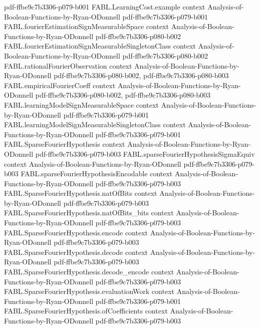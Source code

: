 \begin{theorem}
  {pdf-ffbe9c7b3306-p079-b001}
\proofstep
  {FABL.LearningCost.example}
  {context}
  {Analysis-of-Boolean-Functions-by-Ryan-ODonnell}
  {pdf-ffbe9c7b3306-p079-b001}
\proofstep
  {FABL.fourierEstimationSignMeasurableSpace}
  {context}
  {Analysis-of-Boolean-Functions-by-Ryan-ODonnell}
  {pdf-ffbe9c7b3306-p080-b002}
\proofstep
  {FABL.fourierEstimationSignMeasurableSingletonClass}
  {context}
  {Analysis-of-Boolean-Functions-by-Ryan-ODonnell}
  {pdf-ffbe9c7b3306-p080-b002}
\proofstep
  {FABL.rationalFourierObservation}
  {context}
  {Analysis-of-Boolean-Functions-by-Ryan-ODonnell}
  {pdf-ffbe9c7b3306-p080-b002,
    pdf-ffbe9c7b3306-p080-b003}
\proofstep
  {FABL.empiricalFourierCoeff}
  {context}
  {Analysis-of-Boolean-Functions-by-Ryan-ODonnell}
  {pdf-ffbe9c7b3306-p080-b002,
    pdf-ffbe9c7b3306-p080-b003}
\proofstep
  {FABL.learningModelSignMeasurableSpace}
  {context}
  {Analysis-of-Boolean-Functions-by-Ryan-ODonnell}
  {pdf-ffbe9c7b3306-p079-b001}
\proofstep
  {FABL.learningModelSignMeasurableSingletonClass}
  {context}
  {Analysis-of-Boolean-Functions-by-Ryan-ODonnell}
  {pdf-ffbe9c7b3306-p079-b001}
\proofstep
  {FABL.SparseFourierHypothesis}
  {context}
  {Analysis-of-Boolean-Functions-by-Ryan-ODonnell}
  {pdf-ffbe9c7b3306-p079-b003}
\proofstep
  {FABL.sparseFourierHypothesisSigmaEquiv}
  {context}
  {Analysis-of-Boolean-Functions-by-Ryan-ODonnell}
  {pdf-ffbe9c7b3306-p079-b003}
\proofstep
  {FABL.sparseFourierHypothesisEncodable}
  {context}
  {Analysis-of-Boolean-Functions-by-Ryan-ODonnell}
  {pdf-ffbe9c7b3306-p079-b003}
\proofstep
  {FABL.SparseFourierHypothesis.natOfBits}
  {context}
  {Analysis-of-Boolean-Functions-by-Ryan-ODonnell}
  {pdf-ffbe9c7b3306-p079-b003}
\proofstep
  {FABL.SparseFourierHypothesis.natOfBits_bits}
  {context}
  {Analysis-of-Boolean-Functions-by-Ryan-ODonnell}
  {pdf-ffbe9c7b3306-p079-b003}
\proofstep
  {FABL.SparseFourierHypothesis.encode}
  {context}
  {Analysis-of-Boolean-Functions-by-Ryan-ODonnell}
  {pdf-ffbe9c7b3306-p079-b003}
\proofstep
  {FABL.SparseFourierHypothesis.decode}
  {context}
  {Analysis-of-Boolean-Functions-by-Ryan-ODonnell}
  {pdf-ffbe9c7b3306-p079-b003}
\proofstep
  {FABL.SparseFourierHypothesis.decode_encode}
  {context}
  {Analysis-of-Boolean-Functions-by-Ryan-ODonnell}
  {pdf-ffbe9c7b3306-p079-b003}
\proofstep
  {FABL.SparseFourierHypothesis.evaluationWork}
  {context}
  {Analysis-of-Boolean-Functions-by-Ryan-ODonnell}
  {pdf-ffbe9c7b3306-p079-b001}
\proofstep
  {FABL.SparseFourierHypothesis.ofCoefficients}
  {context}
  {Analysis-of-Boolean-Functions-by-Ryan-ODonnell}
  {pdf-ffbe9c7b3306-p079-b003}

\end{theorem}
